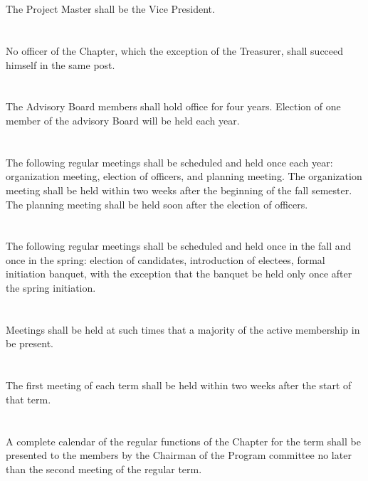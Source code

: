 \documentclass[12pt]{constitution}
\begin{document}
\section{}
The Project Master shall be the Vice President.
\section{}
No officer of the Chapter, which the exception of the Treasurer, shall succeed himself in the same post.
\section{}
The Advisory Board members shall hold office for four years. Election of one member of the advisory Board will be held each year. 

\section{} 
The following regular meetings shall be scheduled and held once each year: organization meeting, election of officers, and planning meeting. The organization meeting shall be held within two weeks after the beginning of the fall semester. The planning meeting shall be held soon after the election of officers. 
\section{}
The following regular meetings shall be scheduled and held once in the fall and once in the spring: election of candidates, introduction of electees, formal initiation banquet, with the exception that the banquet be held only once after the spring initiation.
\section{}
Meetings shall be held at such times that a majority of the active membership
in be present. 
\section{} The first meeting of each term shall be held within two weeks after the start of that  term.
\section{}
A complete calendar of the regular functions of the Chapter for the term shall be presented to the members by the Chairman of the Program committee no later than the second meeting of the regular term. 
\end{document}
